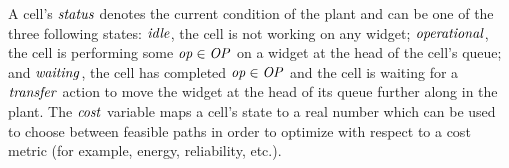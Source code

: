 A cell's $\mathit{status}$ denotes the current condition of the plant and can be one of the three following states: $\mathit{idle}$, the cell is not working on any widget; $\mathit{operational}$, the cell is performing some $\mathit{op} \in \mathit{OP}$ on a widget at the head of the cell's queue; and $\mathit{waiting}$, the cell has completed $\mathit{op} \in \mathit{OP}$ and the cell is waiting for a $\mathit{transfer}$ action to move the widget at the head of its queue further along in the plant.
The $\mathit{cost}$ variable maps a cell's state to a real number which can be used to choose between feasible paths in order to optimize with respect to a cost metric (for example, energy, reliability, etc.). 


\begin{figure}[!ht]
	\centering
\end{figure}

